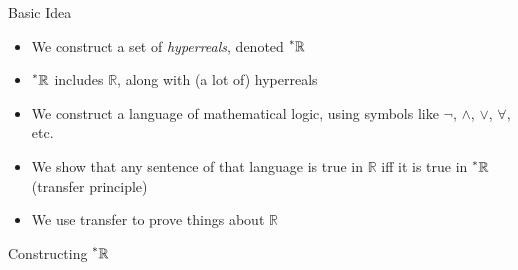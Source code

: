 \documentclass{beamer}
\theoremstyle{plain}
\theoremstyle{definition}
\newcommand{\reals}{\mathbb{R}}
\newcommand{\hreals}{\prescript{*}{}{\mathbb{R}}}
\begin{document}
\begin{frame}{Basic Idea}
\begin{itemize}
	\item We construct a set of \textit{hyperreals}, denoted $\hreals$
	\item $\hreals$ includes $\reals$, along with (a lot of) hyperreals
	\item We construct a language of mathematical logic, using symbols like $\neg$, $\land$, $\lor$, $\forall$, etc.
	\item We show that any sentence of that language is true in $\reals$ iff it is true in $\hreals$ (transfer principle)
	\item We use transfer to prove things about $\reals$
\end{itemize}
\end{frame}

\begin{frame}{Constructing $\hreals$}

\end{frame}
\end{document}
